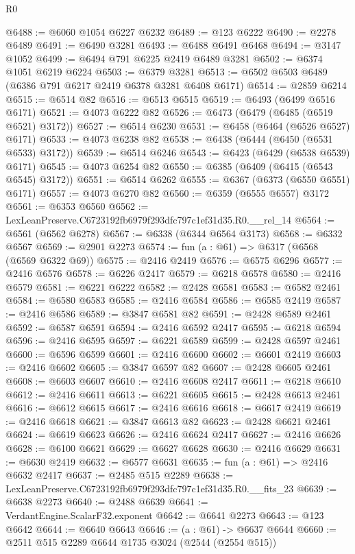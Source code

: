 \begin{lexlean}{R0}
\begin{coremodule}
@6488 := @6060 @1054 @6227 @6232
@6489 := @123 @6222
@6490 := @2278 @6489
@6491 := @6490 @3281
@6493 := @6488 @6491 @6468
@6494 := @3147 @1052
@6499 := @6494 @791 @6225 @2419 @6489 @3281
@6502 := @6374 @1051 @6219 @6224
@6503 := @6379 @3281
@6513 := @6502 @6503 @6489 (@6386 @791 @6217 @2419 @6378 @3281 @6408 @6171)
@6514 := @2859 @6214
@6515 := @6514 @82
@6516 := @6513 @6515
@6519 := @6493 (@6499 @6516 @6171)
@6521 := @4073 @6222 @82
@6526 := @6473 (@6479 (@6485 (@6519 @6521) @3172))
@6527 := @6514 @6230
@6531 := @6458 (@6464 (@6526 @6527) @6171)
@6533 := @4073 @6238 @82
@6538 := @6438 (@6444 (@6450 (@6531 @6533) @3172))
@6539 := @6514 @6246
@6543 := @6423 (@6429 (@6538 @6539) @6171)
@6545 := @4073 @6254 @82
@6550 := @6385 (@6409 (@6415 (@6543 @6545) @3172))
@6551 := @6514 @6262
@6555 := @6367 (@6373 (@6550 @6551) @6171)
@6557 := @4073 @6270 @82
@6560 := @6359 (@6555 @6557) @3172
@6561 := @6353 @6560
@6562 := LexLeanPreserve.C6723192fb6979f293dfc797c1ef31d35.R0.__rel_14
@6564 := @6561 (@6562 @6278)
@6567 := @6338 (@6344 @6564 @3173)
@6568 := @6332 @6567
@6569 := @2901 @2273
@6574 := fun (a : @61) => @6317 (@6568 (@6569 @6322 @69))
@6575 := @2416 @2419
@6576 := @6575 @6296
@6577 := @2416 @6576
@6578 := @6226 @2417
@6579 := @6218 @6578
@6580 := @2416 @6579
@6581 := @6221 @6222
@6582 := @2428 @6581
@6583 := @6582 @2461
@6584 := @6580 @6583
@6585 := @2416 @6584
@6586 := @6585 @2419
@6587 := @2416 @6586
@6589 := @3847 @6581 @82
@6591 := @2428 @6589 @2461
@6592 := @6587 @6591
@6594 := @2416 @6592 @2417
@6595 := @6218 @6594
@6596 := @2416 @6595
@6597 := @6221 @6589
@6599 := @2428 @6597 @2461
@6600 := @6596 @6599
@6601 := @2416 @6600
@6602 := @6601 @2419
@6603 := @2416 @6602
@6605 := @3847 @6597 @82
@6607 := @2428 @6605 @2461
@6608 := @6603 @6607
@6610 := @2416 @6608 @2417
@6611 := @6218 @6610
@6612 := @2416 @6611
@6613 := @6221 @6605
@6615 := @2428 @6613 @2461
@6616 := @6612 @6615
@6617 := @2416 @6616
@6618 := @6617 @2419
@6619 := @2416 @6618
@6621 := @3847 @6613 @82
@6623 := @2428 @6621 @2461
@6624 := @6619 @6623
@6626 := @2416 @6624 @2417
@6627 := @2416 @6626
@6628 := @6100 @6621
@6629 := @6627 @6628
@6630 := @2416 @6629
@6631 := @6630 @2419
@6632 := @6577 @6631
@6635 := fun (a : @61) => @2416 @6632 @2417
@6637 := @2485 @515 @2289
@6638 := LexLeanPreserve.C6723192fb6979f293dfc797c1ef31d35.R0.__fits_23
@6639 := @6638 @2273
@6640 := @2488 @6639
@6641 := VerdantEngine.ScalarF32.exponent
@6642 := @6641 @2273
@6643 := @123 @6642
@6644 := @6640 @6643
@6646 := (a : @61) -> @6637 @6644
@6660 := @2511
    @515
    @2289
    @6644
    @1735
    @3024
    (@2544 (@2554 @515))

\end{coremodule}
\end{lexlean}
